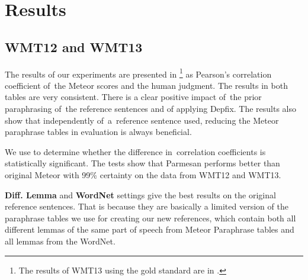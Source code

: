 \begin{table*}[htb]
\caption{Pearson's correlation of Meteor and the gold standard -- \textit{Expected Wins} 
\cite{wmt13}. The results corresponds very well with the silver standard in .} 
\label{results13-ew}
\end{table*}

\section{Results}
\subsection{WMT12 and WMT13}
The results of our experiments are presented in \footnote{The results of WMT13 
using the gold standard are in .} 
as Pearson’s correlation coefficient of~the Meteor scores and 
the human judgment. The results in both tables are very consistent. There is a clear positive 
impact of~the prior paraphrasing of~the reference sentences and of applying Depfix. The results 
also show that independently of~a~reference sentence used, reducing the Meteor paraphrase tables in 
evaluation is always beneficial.

We use \cite{meng1992comparing} to determine whether the difference in~correlation 
coefficients is statistically significant. The tests show that Parmesan performs better than
original Meteor with 99\% certainty on the data from WMT12 and WMT13.

\textbf{Diff. Lemma} and \textbf{WordNet} settings give the best results on the original reference sentences. 
That is because they are basically a limited version of the paraphrase tables we use for creating our
new references, which contain both all different lemmas of the same part of speech from Meteor Paraphrase
tables and all lemmas from the WordNet.

